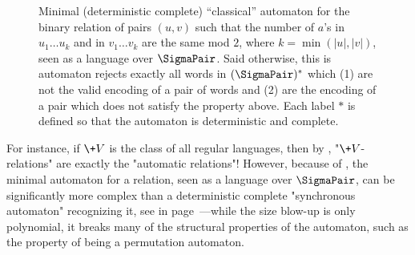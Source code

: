 \begin{figure}[tbp]
	\begin{center}
	\end{center}
	\caption{
		\AP\label{fig:min-auto}
		Minimal (deterministic complete) ``classical'' automaton for 
		the binary relation
		of pairs $(u,v)$ such that the number of $a$'s in $u_1\hdots u_k$
		and in $v_1\hdots v_k$ are the same mod $2$, where $k = \min(|u|, |v|)$,
		seen as a language over $\SigmaPair$.
		Said otherwise, this is automaton rejects exactly all words in $(\SigmaPair)^*$ which (1)
		are not the valid encoding of a pair of words and (2) are the encoding of a pair
		which does not satisfy the property above.
		Each label $*$ is defined so that the automaton is deterministic and complete.
	} 
\end{figure}
For instance, if $\+V$ is the class of all regular languages, then by
, "$\+V$-relations" are exactly the "automatic relations"!
However, because of
, the minimal automaton for a relation, seen as a language over $\SigmaPair$,
can be significantly more complex than a deterministic complete "synchronous automaton" recognizing it, see  in page~\pageref{fig:min-auto}---while the size blow-up is only polynomial, it breaks many of the structural properties of the automaton, such as the property of being a permutation automaton.

